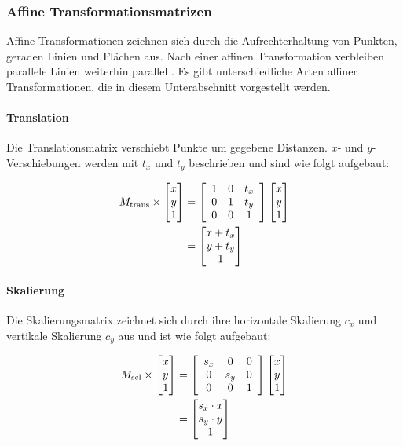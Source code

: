 \subsubsection{Affine Transformationsmatrizen}
\label{sec:affine_transformations_matrizen}

Affine Transformationen zeichnen sich durch die Aufrechterhaltung von Punkten, geraden Linien und Flächen aus. Nach einer affinen Transformation verbleiben parallele Linien weiterhin parallel \cite{cv_general}. Es gibt unterschiedliche Arten affiner Transformationen, die in diesem Unterabschnitt vorgestellt werden.

\paragraph{Translation}
\label{par:translation}

Die Translationsmatrix verschiebt Punkte um gegebene Distanzen. $x$- und $y$-Verschiebungen werden mit $t_x$ und $t_y$ beschrieben und sind wie folgt aufgebaut:

{\setlength{\belowdisplayskip}{0.5ex}
\begin{align*}
    M_\text{trans} \times \begin{bmatrix} x \\ y \\ 1 \end{bmatrix}
     & =
    \left[
        \begin{array}{ccc}
            1 & 0 & t_x \\
            0 & 1 & t_y \\
            0 & 0 & 1   \\
        \end{array}
        \right]
    \begin{bmatrix} x \\ y \\ 1 \end{bmatrix} \\
     & =
    \begin{bmatrix} x + t_x \\ y + t_y \\ 1 \end{bmatrix}
\end{align*}}

\paragraph{Skalierung}
\label{par:skalierung}

Die Skalierungsmatrix zeichnet sich durch ihre horizontale Skalierung $c_x$ und vertikale Skalierung $c_y$ aus und ist wie folgt aufgebaut:

{\setlength{\belowdisplayskip}{0.5ex}
\begin{align*}
    M_\text{scl} \times \begin{bmatrix} x \\ y \\ 1 \end{bmatrix}
     & =
    \left[
        \begin{array}{ccc}
            s_x & 0   & 0 \\
            0   & s_y & 0 \\
            0   & 0   & 1 \\
        \end{array}
        \right]
    \begin{bmatrix} x \\ y \\ 1 \end{bmatrix} \\
     & =
    \begin{bmatrix} s_x \cdot x \\ s_y \cdot y \\ 1 \end{bmatrix}
\end{align*}}

